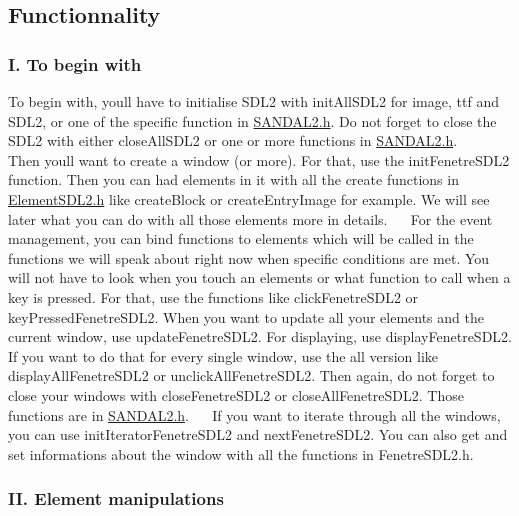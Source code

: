 \subsection*{Functionnality}

\subsubsection*{I. To begin with}

To begin with, you\textquotesingle{}ll have to initialise S\+D\+L2 with init\+All\+S\+D\+L2 for image, ttf and S\+D\+L2, or one of the specific function in \hyperlink{SANDAL2_8h}{S\+A\+N\+D\+A\+L2.\+h}. Do not forget to close the S\+D\+L2 with either close\+All\+S\+D\+L2 or one or more functions in \hyperlink{SANDAL2_8h}{S\+A\+N\+D\+A\+L2.\+h}.~\newline
~\newline
 Then you\textquotesingle{}ll want to create a window (or more). For that, use the init\+Fenetre\+S\+D\+L2 function. Then you can had elements in it with all the create functions in \hyperlink{ElementSDL2_8h}{Element\+S\+D\+L2.\+h} like create\+Block or create\+Entry\+Image for example. We will see later what you can do with all those elements more in details.~\newline
~\newline
 For the event management, you can bind functions to elements which will be called in the functions we will speak about right now when specific conditions are met. You will not have to look when you touch an elements or what function to call when a key is pressed. For that, use the functions like click\+Fenetre\+S\+D\+L2 or key\+Pressed\+Fenetre\+S\+D\+L2. When you want to update all your elements and the current window, use update\+Fenetre\+S\+D\+L2. For displaying, use display\+Fenetre\+S\+D\+L2. If you want to do that for every single window, use the \textquotesingle{}all\textquotesingle{} version like display\+All\+Fenetre\+S\+D\+L2 or unclick\+All\+Fenetre\+S\+D\+L2. Then again, do not forget to close your windows with close\+Fenetre\+S\+D\+L2 or close\+All\+Fenetre\+S\+D\+L2. Those functions are in \hyperlink{SANDAL2_8h}{S\+A\+N\+D\+A\+L2.\+h}.~\newline
~\newline
 If you want to iterate through all the windows, you can use init\+Iterator\+Fenetre\+S\+D\+L2 and next\+Fenetre\+S\+D\+L2. You can also get and set informations about the window with all the functions in Fenetre\+S\+D\+L2.\+h.~\newline


\subsubsection*{II. Element manipulations}